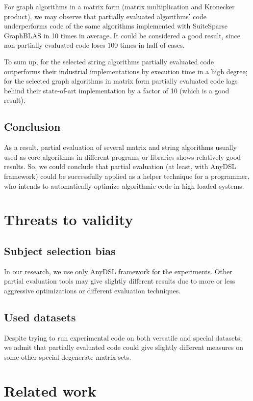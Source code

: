 \documentclass[conference]{IEEEtran}
\begin{document}
For graph algorithms in a matrix form (matrix multiplication and Kronecker product), we may observe that partially evaluated algorithms' code underperforms code of the same algorithms implemented with SuiteSparse GraphBLAS in 10 times in average. It could be considered a good result, since non-partially evaluated code loses 100 times in half of cases.

To sum up, for the selected string algorithms partially evaluated code outperforms their industrial implementations by execution time in a high degree; for the selected graph algorithms in matrix form partially evaluated code lags behind their state-of-art implementation by a factor of 10 (which is a good result).

\subsection{Conclusion}
As a result, partial evaluation of several matrix and string algorithms usually used as core algorithms in different programs or libraries shows relatively good results. So, we could conclude that partial evaluation (at least, with AnyDSL framework) could be successfully applied as a helper technique for a programmer, who intends to automatically optimize algorithmic code in high-loaded systems.


\section{Threats to validity}

\subsection{Subject selection bias}
In our research, we use only AnyDSL framework for the experiments. Other partial evaluation tools may give slightly different results due to more or less aggressive optimizations or different evaluation techniques.

\subsection{Used datasets}
Despite trying to run experimental code on both versatile and special datasets, we admit that partially evaluated code could give slightly different measures on some other special degenerate matrix sets.

\section{Related work}
\end{document}
